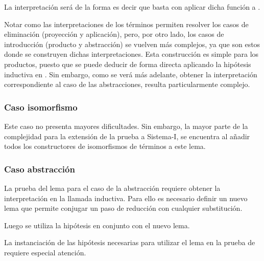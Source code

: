 
La interpretación  será de la forma
\snstar{}
\snstar{}
es decir que basta con aplicar dicha función a .

Notar como las interpretaciones de los términos permiten resolver los casos de eliminación (proyección y aplicación), pero, por otro lado, los casos de introducción (producto y abstracción) se vuelven más complejos, ya que son estos donde se construyen dichas interpretaciones.
Esta construcción es simple para los productos, puesto que se puede deducir de forma directa aplicando la hipótesis inductiva en .	
Sin embargo, como se verá más adelante, obtener la interpretación correspondiente al caso de las abstracciones, resulta particularmente complejo.

\subsubsection{Caso isomorfismo}

Este caso no presenta mayores dificultades. Sin embargo, la mayor parte de la complejidad para la extensión de la prueba a Sistema-I, se encuentra al añadir todos los constructores de isomorfismos de términos a este lema.


\subsubsection{Caso abstracción}

La prueba del lema para el caso de la abstracción requiere obtener la interpretación  en la llamada inductiva.
Para ello es necesario definir un nuevo lema que permite conjugar un paso de reducción con cualquier substitución.


Luego se utiliza la hipótesis  en conjunto con el nuevo lema.


La instanciación de las hipótesis necesarias para utilizar el lema en la prueba de  requiere especial atención.

